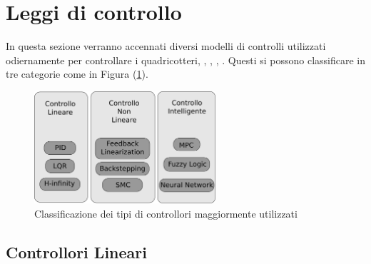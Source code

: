 \section{Leggi di controllo}
In questa sezione verranno accennati diversi modelli di controlli utilizzati odiernamente per controllare i quadricotteri, \cite{ZuluAndrew2014ARoC}, \cite{KimJinho2020ACSo}, \cite{PID_vs_LQ}, \cite{G_inf}. Questi si possono classificare in tre categorie come in Figura (\ref{fig:categoriecontrolli}).
\begin{figure}
	\centering
	\includegraphics[width=0.6\textwidth]{SistemaQuadrirotore/Figure/Classificazione}
	\caption{Classificazione dei tipi di controllori maggiormente utilizzati \cite{KimJinho2020ACSo}}
	\label{fig:categoriecontrolli}
\end{figure}



\subsection{Controllori Lineari}
